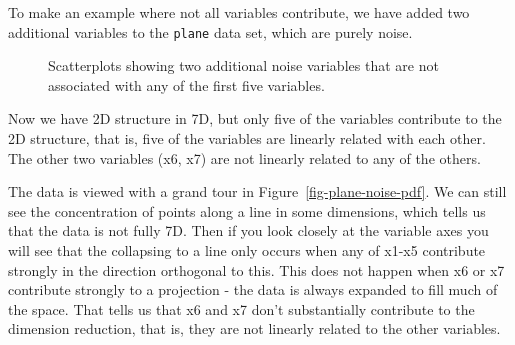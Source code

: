 \documentclass[
  letterpaper,
]{krantz}
\newenvironment{Shaded}{\begin{snugshade}}{\end{snugshade}}
\newcommand{\CommentTok}[1]{\textcolor[rgb]{0.37,0.37,0.37}{#1}}
\newcommand{\ControlFlowTok}[1]{\textcolor[rgb]{0.00,0.23,0.31}{\textbf{#1}}}
\newcommand{\DecValTok}[1]{\textcolor[rgb]{0.68,0.00,0.00}{#1}}
\newcommand{\FunctionTok}[1]{\textcolor[rgb]{0.28,0.35,0.67}{#1}}
\newcommand{\NormalTok}[1]{\textcolor[rgb]{0.00,0.23,0.31}{#1}}
\newcommand{\OtherTok}[1]{\textcolor[rgb]{0.00,0.23,0.31}{#1}}
\newcommand{\SpecialCharTok}[1]{\textcolor[rgb]{0.37,0.37,0.37}{#1}}
\begin{document}
To make an example where not all variables contribute, we have added two
additional variables to the \texttt{plane} data set, which are purely
noise.

\begin{Shaded}
\end{Shaded}

\begin{figure}


\caption{\label{fig-plane-noise-scatter}Scatterplots showing two
additional noise variables that are not associated with any of the first
five variables.}

\end{figure}%

Now we have 2D structure in 7D, but only five of the variables
contribute to the 2D structure, that is, five of the variables are
linearly related with each other. The other two variables (x6, x7) are
not linearly related to any of the others.

The data is viewed with a grand tour in
Figure~\ref{fig-plane-noise-pdf}. We can still see the concentration of
points along a line in some dimensions, which tells us that the data is
not fully 7D. Then if you look closely at the variable axes you will see
that the collapsing to a line only occurs when any of x1-x5 contribute
strongly in the direction orthogonal to this. This does not happen when
x6 or x7 contribute strongly to a projection - the data is always
expanded to fill much of the space. That tells us that x6 and x7 don't
substantially contribute to the dimension reduction, that is, they are
not linearly related to the other variables.
\end{document}
